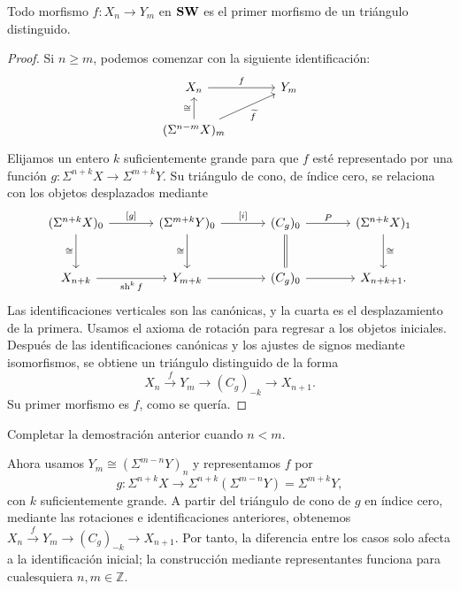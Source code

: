 \begin{teo}\label{teo:cono}
Todo morfismo $f\colon X_n\to Y_m$ en $\mathbf{SW}$ es el primer morfismo de un triángulo distinguido.
\end{teo}
\begin{proof}
Si $n\geq m$, podemos comenzar con la siguiente identificación:
\[
\begin{tikzcd}[column sep=large]
X_n \arrow[r,"f"] & Y_m\\
(\Sigma^{n-m}X)_m \arrow[u,"\cong"] \arrow[ur,"\widetilde f"'] &
\end{tikzcd}
\]
Elijamos un entero $k$ suficientemente grande para que $f$ esté representado por una función $g\colon\Sigma^{n+k}X\to\Sigma^{m+k}Y$. Su triángulo de cono, de índice cero, se relaciona con los objetos desplazados mediante
\[
\begin{tikzcd}[column sep=large,row sep=large]
(\Sigma^{n+k}X)_0 \arrow[r,"{[g]}"] \arrow[d,"\cong"'] & (\Sigma^{m+k}Y)_0 \arrow[r,"{[i]}"] \arrow[d,"\cong"'] & (C_g)_0 \arrow[r,"P"] \arrow[d,equal] & (\Sigma^{n+k}X)_1 \arrow[d,"\cong"]\\
X_{n+k} \arrow[r,"\sh^k f"'] & Y_{m+k} \arrow[r] & (C_g)_0 \arrow[r] & X_{n+k+1}.
\end{tikzcd}
\]
Las identificaciones verticales son las canónicas, y la cuarta es el desplazamiento de la primera. Usamos el axioma de rotación para regresar a los objetos iniciales. Después de las identificaciones canónicas y los ajustes de signos mediante isomorfismos, se obtiene un triángulo distinguido de la forma
\[
X_n\xrightarrow{f}Y_m\longrightarrow(C_g)_{-k}\longrightarrow X_{n+1}.
\]
Su primer morfismo es $f$, como se quería.
\end{proof}

\begin{ejer}[El caso $n<m$]
Completar la demostración anterior cuando $n<m$.
\end{ejer}
\begin{sol}
Ahora usamos $Y_m\cong(\Sigma^{m-n}Y)_n$ y representamos $f$ por
\[
g\colon\Sigma^{n+k}X\to\Sigma^{n+k}(\Sigma^{m-n}Y)=\Sigma^{m+k}Y,
\]
 con $k$ suficientemente grande. A partir del triángulo de cono de $g$ en índice cero, mediante las rotaciones e identificaciones anteriores, obtenemos $X_n\xrightarrow{f}Y_m\to(C_g)_{-k}\to X_{n+1}$. Por tanto, la diferencia entre los casos solo afecta a la identificación inicial; la construcción mediante representantes funciona para cualesquiera $n,m\in\mathbb Z$.
\end{sol}

